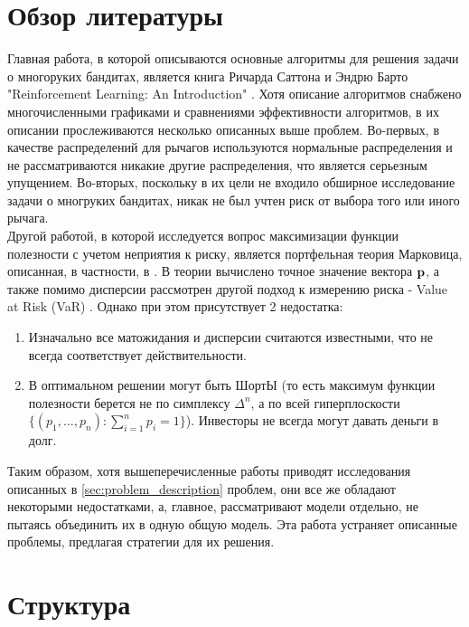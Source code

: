 \section{Обзор литературы}

Главная работа, в которой описываются основные алгоритмы для решения задачи о многоруких бандитах, является книга Ричарда Саттона и Эндрю Барто "Reinforcement Learning: An Introduction" \cite{bouchaudpotters}. Хотя описание алгоритмов снабжено многочисленными графиками и сравнениями эффективности алгоритмов, в их описании прослеживаются несколько описанных выше проблем. Во-первых, в качестве распределений для рычагов используются нормальные распределения и не рассматриваются никакие другие распределения, что является серьезным упущением. Во-вторых, поскольку в их цели не входило обширное исследование задачи о многруких бандитах, никак не был учтен риск от выбора того или иного рычага. \\

Другой работой, в которой исследуется вопрос максимизации функции полезности с учетом неприятия к риску, является портфельная теория Марковица, описанная, в частности, в \cite{bouchaudpotters}. В теории вычислено точное значение вектора $\textbf{p}$, а также помимо дисперсии рассмотрен другой подход к измерению риска - Value at Risk (VaR) \cite{varbouchaudpotters}. Однако при этом присутствует 2 недостатка:
\begin{enumerate}
    \item Изначально все матожидания и дисперсии считаются известными, что не всегда соответствует действительности.
    \item В оптимальном решении могут быть ШортЫ (то есть максимум функции полезности берется не по симплексу $\Delta^n$, а по всей гиперплоскости $\{(p_1, ..., p_n): \sum_{i=1}^n p_i = 1\}$). Инвесторы не всегда могут давать деньги в долг.
\end{enumerate}

Таким образом, хотя вышеперечисленные работы приводят исследования описанных в \ref{sec:problem_description} проблем, они все же обладают некоторыми недостатками, а, главное, рассматривают модели отдельно, не пытаясь объединить их в одную общую модель. Эта работа устраняет описанные проблемы, предлагая стратегии для их решения.

\section{Структура}

